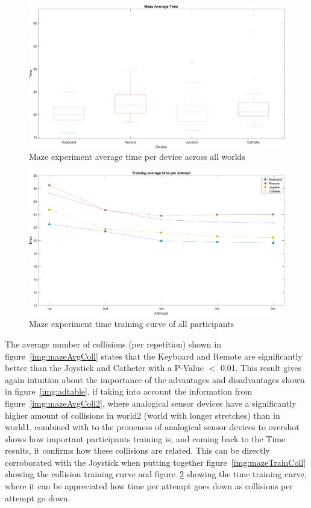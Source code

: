 \begin{figure}[ht]
   \centering
   \includegraphics[width=1.0\textwidth]{img/maze/mazeTime.png}
   \caption{Maze experiment average time per device across all worlds}
   \label{img:mazeTime}
\end{figure}

\begin{figure}[ht]
   \centering
   \includegraphics[width=1.0\textwidth]{img/maze/mazeTrainTime.png}
   \caption{Maze experiment time training curve of all participants}
   \label{img:mazeTrainTime}
\end{figure}

The average number of collisions (per repetition) shown in figure~\ref{img:mazeAvgColl} states that the Keyboard and Remote are significantly better than the Joystick and Catheter with a P-Value $<$ 0.01. This result gives again intuition about the importance of the advantages and disadvantages shown in figure~\ref{img:adtable}, if taking into account the information from figure~\ref{img:mazeAvgColl2}, where analogical sensor devices have a significantly higher amount of collisions in world2 (world with longer stretches) than in world1, combined with to the proneness of analogical sensor devices to overshot shows how important participants training is, and coming back to the Time results, it confirms how these collisions are related. This can be directly corroborated with the Joystick when putting together figure~\ref{img:mazeTrainColl} showing the collision training curve and figure~\ref{img:mazeTrainTime} showing the time training curve, where it can be appreciated how time per attempt goes down as collisions per attempt go down.\\

